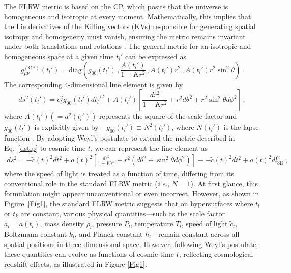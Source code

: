 \documentclass[jkps,preprint,fleqn]{revtex4} %
\newcommand{\tc}{\tilde{c}}
\begin{document}
The FLRW metric is based on the CP, which posits that the universe is homogeneous and isotropic at every moment. Mathematically, this implies that the Lie derivatives of the Killing vectors (KVs) responsible for generating spatial isotropy and homogeneity must vanish, ensuring the metric remains invariant under both translations and rotations \cite{Lee:2024mal,Ryder09}. The general metric for an isotropic and homogeneous space at a given time $t_l'$ can be expressed as
\begin{equation}
g_{\mu\nu}^{(\text{CP})}(t_l') = \text{diag} \left( g_{00}(t_l') \,,  \frac{A(t_l')}{1-Kr^2} \,,  A(t_l') r^2 \,,  A(t_l') r^2 \sin^2 \theta \right) \,.
\end{equation}
The corresponding 4-dimensional line element is given by
\begin{equation}
ds^2(t_l') = c_l^2 g_{00}(t_l') dt_l'^2 + A(t_l') \left[ \frac{dr^2}{1-Kr^2} + r^2 d \theta^2 + r^2 \sin^2 \theta d \phi^2 \right] \label{dstlp} \,,
\end{equation}
where $A(t_l') (= a^2(t_l'))$ represents the square of the scale factor and \( g_{00}(t_l') \) is explicitly given by \(- g_{00}(t_l') \equiv N^2(t_l') \), where \( N(t_l') \) is the lapse function \cite{Lee:2024zcu,Ryder09}. By adopting Weyl's postulate to extend the metric described in Eq.~\eqref{dstlp} to cosmic time $t$, we can represent the line element as
\begin{align}
ds^2 = - \tc(t)^2 dt^2 + a(t)^2 \left[ \frac{dr^2}{1-Kr^2} + r^2  \left( d \theta^2 + \sin^2 \theta d \phi^2 \right)  \right] \equiv - \tc(t)^2 dt^2 + a(t)^2 dl_{3\textrm{D}}^2 \label{dstgen} \,,
\end{align} 
where the speed of light is treated as a function of time, differing from its conventional role in the standard FLRW metric (\textit{i.e.}, $N = 1$). At first glance, this formulation might appear unconventional or even incorrect. However, as shown in Figure~\ref{Fig1}, the standard FLRW metric suggests that on hypersurfaces where $t_l$ or $t_k$ are constant, various physical quantities—such as the scale factor $a_l = a(t_l)$, mass density $\rho_l$, pressure $P_l$, temperature $T_l$, speed of light $\tc_l$, Boltzmann constant $k_l$, and Planck constant $\hbar_l $—remain constant across all spatial positions in three-dimensional space. However, following Weyl’s postulate, these quantities can evolve as functions of cosmic time $t$, reflecting cosmological redshift effects, as illustrated in Figure \ref{Fig1}.
\end{document}
